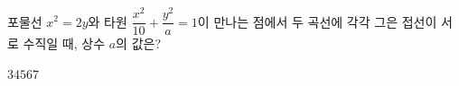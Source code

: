 포물선 $x^2=2y$와 타원 $\dfrac{x^2}{10}+\dfrac{y^2}{a}=1$이 만나는 점에서 두 곡선에 각각 그은 접선이 서로 수직일 때, 상수 $a$의 값은?
\begin{choices32}{$3$}{$4$}{$5$}{$6$}{$7$}\end{choices32}
